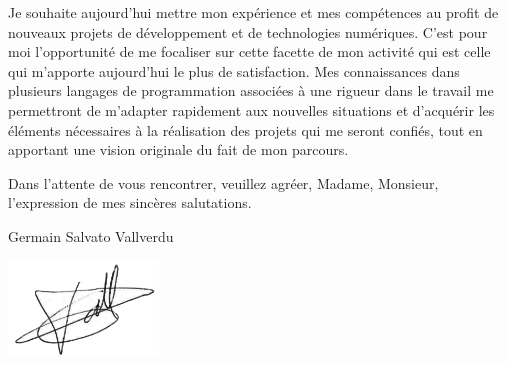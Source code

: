 \documentclass[11pt,a4paper,ragged2e]{alta_letter}
\begin{document}
Je souhaite aujourd'hui mettre mon expérience et mes compétences au profit de nouveaux
projets de développement et de technologies numériques. C'est pour moi
l'opportunité de me focaliser sur cette facette de mon activité qui est celle qui m'apporte
aujourd'hui le plus de satisfaction. Mes connaissances dans
plusieurs langages de programmation associées à une
rigueur dans le travail me permettront de m'adapter rapidement aux nouvelles
situations et d'acquérir les éléments nécessaires à la réalisation des projets qui me
seront confiés, tout en apportant une vision originale du fait de mon parcours.

Dans l'attente de vous rencontrer, veuillez agréer, Madame, Monsieur, l'expression de mes sincères salutations.

\vspace{1cm}

\hspace{.6\textwidth}Germain Salvato Vallverdu

\hspace{.6\textwidth}\includegraphics[width=4cm]{maSignature}
\end{document}
